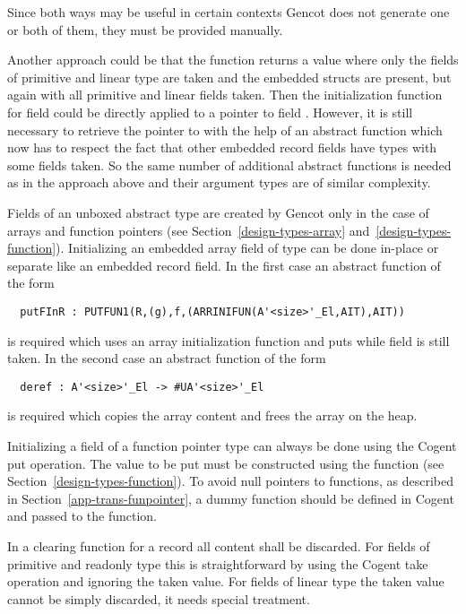 Since both ways may be useful in certain contexts Gencot does not generate one or both of them, they must be provided manually.

Another approach could be that the function  returns a value where only the fields of primitive and linear type
are taken and the embedded structs are present, but again with all primitive and linear fields taken. Then the initialization function for
field  could be directly applied to a pointer to field . However, it is still necessary to retrieve the pointer to 
with the help of an abstract function which now has to respect the fact that other embedded record fields have types with
some fields taken. So the same number of additional abstract functions is needed as in the approach above and their argument
types are of similar complexity.

Fields of an unboxed abstract type are created by Gencot only in the case of arrays and function pointers (see 
Section~\ref{design-types-array} and~\ref{design-types-function}). Initializing an embedded array field  of type 
 can be done in-place or separate like an embedded record field. In the first case an abstract
function of the form 
\begin{verbatim}
  putFInR : PUTFUN1(R,(g),f,(ARRINIFUN(A'<size>'_El,AIT),AIT))
\end{verbatim}
is required which uses an array initialization function and puts  while field  is still taken. 
In the second case an abstract function of the form
\begin{verbatim}
  deref : A'<size>'_El -> #UA'<size>'_El
\end{verbatim}
is required which copies the array content and frees the array on the heap.

Initializing a field  of a function pointer type  can always be done using the Cogent put operation.
The value to be put must be constructed using the function  (see Section~\ref{design-types-function}). To
avoid null pointers to functions, as described in Section~\ref{app-trans-funpointer}, a dummy function should be defined in
Cogent and passed to the  function.

In a clearing function for a record all content shall be discarded. For fields of primitive and readonly type this is
straightforward by using the Cogent take operation and ignoring the taken value. For fields of linear type the taken value
cannot be simply discarded, it needs special treatment.

